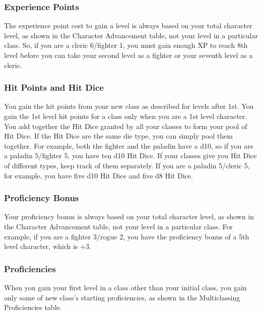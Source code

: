 \documentclass[
]{article}
\begin{document}
\hypertarget{experience-points}{%
\subsubsection{Experience Points}\label{experience-points}}

The experience point cost to gain a level is always based on your total
character level, as shown in the Character Advancement table, not your
level in a particular class. So, if you are a cleric 6/fighter 1, you
must gain enough XP to reach 8th level before you can take your second
level as a fighter or your seventh level as a cleric.

\hypertarget{hit-points-and-hit-dice}{%
\subsubsection{Hit Points and Hit Dice}\label{hit-points-and-hit-dice}}

You gain the hit points from your new class as described for levels
after 1st. You gain the 1st level hit points for a class only when you
are a 1st level character. You add together the Hit Dice granted by all
your classes to form your pool of Hit Dice. If the Hit Dice are the same
die type, you can simply pool them together. For example, both the
fighter and the paladin have a d10, so if you are a paladin 5/fighter 5,
you have ten d10 Hit Dice. If your classes give you Hit Dice of
different types, keep track of them separately. If you are a paladin
5/cleric 5, for example, you have five d10 Hit Dice and five d8 Hit
Dice.

\hypertarget{proficiency-bonus}{%
\subsubsection{Proficiency Bonus}\label{proficiency-bonus}}

Your proficiency bonus is always based on your total character level, as
shown in the Character Advancement table, not your level in a particular
class. For example, if you are a fighter 3/rogue 2, you have the
proficiency bonus of a 5th level character, which is +3.

\hypertarget{proficiencies}{%
\subsubsection{Proficiencies}\label{proficiencies}}

When you gain your first level in a class other than your initial class,
you gain only some of new class's starting proficiencies, as shown in
the Multiclassing Proficiencies table.
\end{document}
